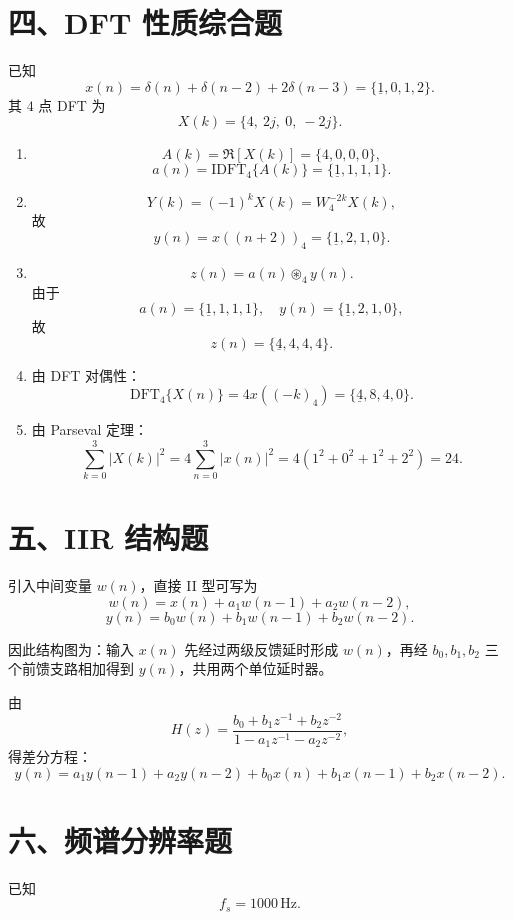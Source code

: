 \documentclass[UTF8,a4paper,12pt]{ctexart}
\begin{document}
\section*{四、DFT 性质综合题}

已知
\[
x(n)=\delta(n)+\delta(n-2)+2\delta(n-3)
=\{\underline{1},0,1,2\}.
\]
其 $4$ 点 DFT 为
\[
X(k)=\{4,\ 2j,\ 0,\ -2j\}.
\]

\begin{enumerate}[label=（\arabic*）, leftmargin=2.5em]

\item
\[
A(k)=\Re[X(k)]=\{4,0,0,0\},
\]
\[
a(n)=\mathrm{IDFT}_4\{A(k)\}
=\{\underline{1},1,1,1\}.
\]

\item
\[
Y(k)=(-1)^kX(k)=W_4^{-2k}X(k),
\]
故
\[
y(n)=x((n+2))_4=\{\underline{1},2,1,0\}.
\]

\item
\[
z(n)=a(n)\circledast_4 y(n).
\]
由于
\[
a(n)=\{\underline{1},1,1,1\},
\quad
y(n)=\{\underline{1},2,1,0\},
\]
故
\[
z(n)=\{\underline{4},4,4,4\}.
\]

\item 由 DFT 对偶性：
\[
\mathrm{DFT}_4\{X(n)\}=4x((-k)_4)
=\{\underline{4},8,4,0\}.
\]

\item 由 Parseval 定理：
\[
\sum_{k=0}^{3}|X(k)|^2
=
4\sum_{n=0}^{3}|x(n)|^2
=
4(1^2+0^2+1^2+2^2)=24.
\]

\end{enumerate}

\section*{五、IIR 结构题}

引入中间变量 $w(n)$，直接 II 型可写为
\[
w(n)=x(n)+a_1w(n-1)+a_2w(n-2),
\]
\[
y(n)=b_0w(n)+b_1w(n-1)+b_2w(n-2).
\]

因此结构图为：输入 $x(n)$ 先经过两级反馈延时形成 $w(n)$，再经 $b_0,b_1,b_2$ 三个前馈支路相加得到 $y(n)$，共用两个单位延时器。

由
\[
H(z)=
\frac{b_0+b_1z^{-1}+b_2z^{-2}}
{1-a_1z^{-1}-a_2z^{-2}},
\]
得差分方程：
\[
\boxed{
y(n)=a_1y(n-1)+a_2y(n-2)
+b_0x(n)+b_1x(n-1)+b_2x(n-2)
}.
\]

\section*{六、频谱分辨率题}

已知
\[
f_s=1000\,\mathrm{Hz}.
\]
\end{document}
